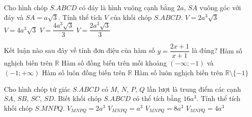 \begin{ex}%
Cho hình chóp $S.ABCD$ có đáy là hình vuông cạnh bằng $2a$, $SA$ vuông góc với đáy và $SA = a\sqrt{3}$. Tính thể tích $V$ của khối chóp $S.ABCD$.
\choice
{$V = 2a^3\sqrt{3}$}
{$V = 4a^3\sqrt{3}$}
{\True $ V = \dfrac{4a^3\sqrt{3}}{3}$}
{$V = \dfrac{2a^3\sqrt{3}}{3}$}
\end{ex}

\begin{ex}%
Kết luận nào sau đây về tính đơn điệu của hàm số $y = \dfrac{2x + 1}{x + 1}$ là đúng?
\choice
{Hàm số nghịch biến trên $\mathbb{R}$}
{\True Hàm số đồng biến trên mỗi khoảng $(-\infty; -1)$ và $(-1; +\infty)$}
{Hàm số luôn đồng biến trên $\mathbb{R}$}
{Hàm số luôn nghịch biến trên $\mathbb{R} \setminus \{-1\}$}
\end{ex} 

\begin{ex}%
Cho hình chóp tứ giác $S.ABCD$ có $M$, $N$, $P$, $Q$ lần lượt là trung điểm các cạnh $SA$, $SB$, $SC$, $SD$. Biết khối chóp $S.ABCD$ có thể tích bằng $16a^3$. Tính thể tích khối chóp $S.MNPQ$.
\choice
{\True $V_{MNPQ} = 2a^3$}
{$V_{MNPQ} = a^3$}
{$V_{MNPQ} = 8a^3$}
{$V_{MNPQ} = 4a^3$}
\end{ex}

